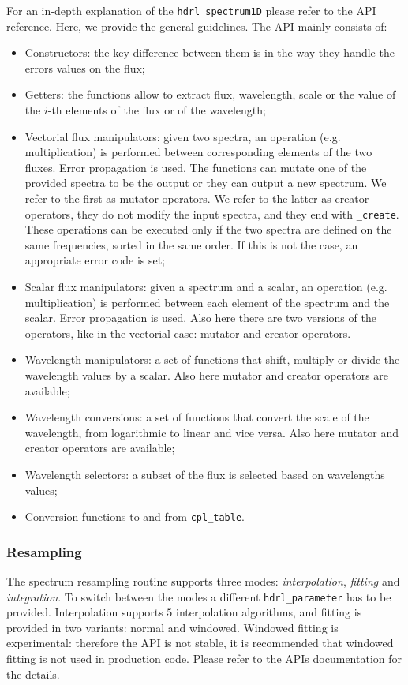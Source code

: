 For an in-depth explanation of the \verb+hdrl_spectrum1D+ please refer to the API reference. Here, we provide the general guidelines. The API mainly consists of:
\begin{itemize}
\item Constructors: the key difference between them is in the way they handle the errors values on the flux;
\item Getters: the functions allow to extract flux, wavelength, scale or the value of the $i$-th elements of the flux or of the wavelength;
\item Vectorial flux manipulators: given two spectra, an operation (e.g. multiplication) is performed between corresponding elements of the two fluxes. Error propagation is used. The functions can mutate one of the provided spectra to be the output or they can output a new spectrum. We refer to the first as mutator operators. We refer to the latter as creator operators, they do not modify the input spectra, and they end with \verb+_create+.
These operations can be executed only if the two spectra are defined on the same frequencies, sorted in the same order. If this is not the case, an appropriate error code is set;
\item Scalar flux manipulators: given a spectrum and a scalar, an operation (e.g. multiplication) is performed between each element of the spectrum and the scalar. Error propagation is used. Also here there are two versions of the operators, like in the vectorial case: mutator and creator operators.
\item Wavelength manipulators: a set of functions that shift, multiply or divide the wavelength values by a scalar. Also here mutator and creator operators are available;
\item Wavelength conversions: a set of functions that convert the scale of the wavelength, from logarithmic to linear and vice versa. Also here mutator and creator operators are available;
\item Wavelength selectors: a subset of the flux is selected based on wavelengths values;
\item Conversion functions to and from \verb+cpl_table+.
\end{itemize}
\subsubsection{Resampling}
The spectrum resampling routine supports three modes: \textit{interpolation}, \textit{fitting} and \textit{integration}. To switch between the modes a different \verb+hdrl_parameter+ has to be provided. Interpolation supports $5$ interpolation algorithms, and fitting is provided in two variants: normal and windowed. Windowed fitting is experimental: therefore the API is not stable, it is recommended that windowed fitting is not used in production code. Please refer to the APIs documentation for the details.
